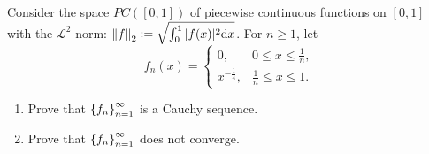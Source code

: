 \documentclass[11pt,a4paper]{article}
\begin{document}
\begin{exercise}
  Consider the space $PC([0,1])$ of piecewise continuous functions on $[0,1]$
  with the $\mathcal L^2$ norm:
  $\norm{f}_2 := \sqrt{\int_{0}^{1} |f(x)|^2 \dx}$.
  For $n \geq 1$, let
  \[
    f_n(x) =
    \begin{cases}
      0, &0 \le x \le \frac{1}{n}, \\
      x^{-\frac{1}{4}}, &\frac{1}{n} \le x \le 1.
    \end{cases}
  \]
  \begin{enumerate}
    \item[(1)] Prove that $\left\{f_n\right\}_{n=1}^{\infty}$ is a Cauchy sequence.
    \item[(2)] Prove that $\left\{f_n\right\}_{n=1}^{\infty}$ does not converge.
  \end{enumerate}
\end{exercise}
\end{document}
